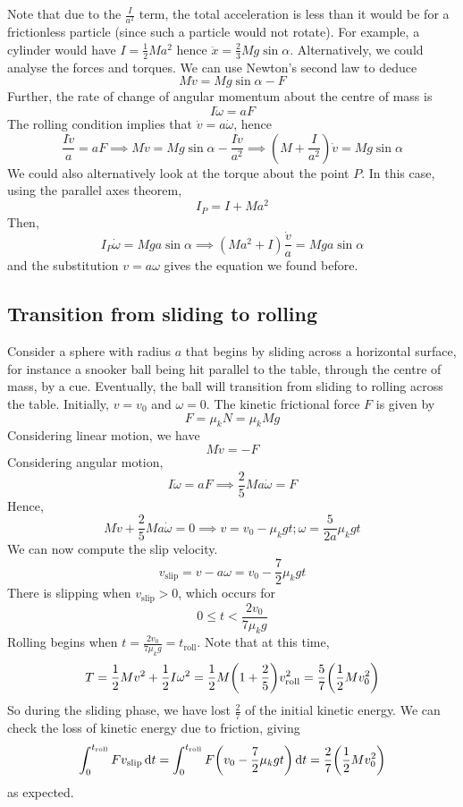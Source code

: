 Note that due to the \(\frac{I}{a^2}\) term, the total acceleration is less than it would be for a frictionless particle (since such a particle would not rotate).
For example, a cylinder would have \(I = \frac{1}{2}Ma^2\) hence \(\ddot x = \frac{2}{3}Mg\sin\alpha\).
Alternatively, we could analyse the forces and torques.
We can use Newton's second law to deduce
\[
	M\dot v = Mg\sin\alpha - F
\]
Further, the rate of change of angular momentum about the centre of mass is
\[
	I \dot\omega = aF
\]
The rolling condition implies that \(\dot v = a \dot\omega\), hence
\[
	\frac{I\dot v}{a} = aF \implies M\dot v = Mg\sin\alpha - \frac{I\dot v}{a^2} \implies \left( M + \frac{I}{a^2} \right)\dot v = Mg\sin\alpha
\]
We could also alternatively look at the torque about the point \(P\).
In this case, using the parallel axes theorem,
\[
	I_P = I + Ma^2
\]
Then,
\[
	I_P \dot\omega = Mga\sin\alpha \implies (M a^2 + I)\frac{\dot v}{a} = Mga\sin\alpha
\]
and the substitution \(v = a\omega\) gives the equation we found before.

\subsection{Transition from sliding to rolling}
Consider a sphere with radius \(a\) that begins by sliding across a horizontal surface, for instance a snooker ball being hit parallel to the table, through the centre of mass, by a cue.
Eventually, the ball will transition from sliding to rolling across the table.
Initially, \(v = v_0\) and \(\omega = 0\).
The kinetic frictional force \(F\) is given by
\[
	F = \mu_k N = \mu_k Mg
\]
Considering linear motion, we have
\[
	M \dot v = -F
\]
Considering angular motion,
\[
	I\dot\omega = aF \implies \frac{2}{5}Ma \dot\omega = F
\]
Hence,
\[
	M\dot v +\frac{2}{5}Ma \dot\omega = 0 \implies v = v_0 - \mu_k g t; \omega = \frac{5}{2a}\mu_k g t
\]
We can now compute the slip velocity.
\[
	v_\text{slip} = v - a\omega = v_0 - \frac{7}{2}\mu_k gt
\]
There is slipping when \(v_\text{slip} > 0\), which occurs for
\[
	0 \leq t < \frac{2v_0}{7\mu_k g}
\]
Rolling begins when \(t = \frac{2v_0}{7\mu_k g} = t_\text{roll}\).
Note that at this time,
\[
	T = \frac{1}{2}Mv^2 + \frac{1}{2}I\omega^2 = \frac{1}{2}M\qty(1 + \frac{2}{5})v_\text{roll}^2 = \frac{5}{7}\qty( \frac{1}{2} Mv_0^2 )
\]
So during the sliding phase, we have lost \(\frac{2}{7}\) of the initial kinetic energy.
We can check the loss of kinetic energy due to friction, giving
\[
	\int_0^{t_\text{roll}} F v_\text{slip} \dd{t} = \int_0^{t_\text{roll}} F \qty(v_0 - \frac{7}{2}\mu_k gt) \dd{t} = \frac{2}{7}\qty(\frac{1}{2}Mv_0^2)
\]
as expected.
